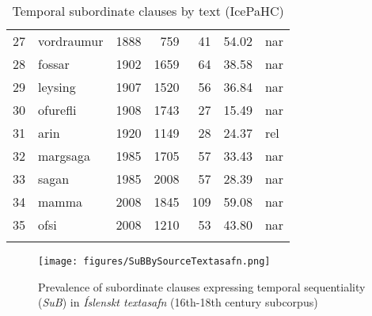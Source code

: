 \documentclass[output=paper,colorlinks,citecolor=brown]{langscibook}
\begin{document}
\begin{paperappendix}
\begin{table}
\begin{tabularx}{\textwidth}{rXrrrrl}
27 & vordraumur & 1888 & 759 &  41 & 54.02 & nar \\
28 & fossar & 1902 & 1659 &  64 & 38.58 & nar \\
29 & leysing & 1907 & 1520 &  56 & 36.84 & nar \\
30 & ofurefli & 1908 & 1743 &  27 & 15.49 & nar \\
31 & arin & 1920 & 1149 &  28 & 24.37 & rel \\
32 & margsaga & 1985 & 1705 &  57 & 33.43 & nar \\
33 & sagan & 1985 & 2008 &  57 & 28.39 & nar \\
34 & mamma & 2008 & 1845 & 109 & 59.08 & nar \\
35 & ofsi & 2008 & 1210 &  53 & 43.80 & nar \\
\lspbottomrule
\end{tabularx}
\caption{Temporal subordinate clauses by text (IcePaHC)}
\label{ex:tempsubtable}
\end{table}


 \begin{figure}[ht]
        \texttt{[image: figures/SuBBySourceTextasafn.png]}
        \caption{Prevalence of subordinate clauses expressing temporal sequentiality (\textit{SuB}) in \textit{Íslenskt textasafn} (16th-18th century subcorpus)}
        \label{fig:subtextasafnplot}
\end{figure}
\end{paperappendix}
\end{document}
